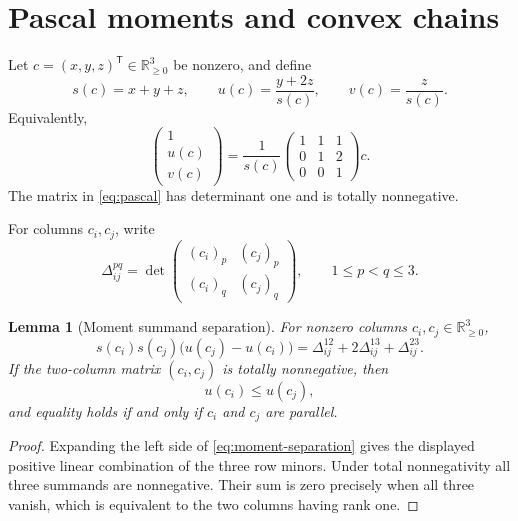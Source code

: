 \documentclass{amsart}
\numberwithin{equation}{section}
\newtheorem{lemma}[theorem]{Lemma}
\theoremstyle{definition}
\theoremstyle{remark}
\newcommand{\RR}{\mathbb R}
\newcommand{\transpose}{\mathsf T}
\begin{document}
\section{Pascal moments and convex chains}

Let $c=(x,y,z)^{\transpose}\in\RR_{\ge0}^3$ be nonzero, and define
\begin{equation}\label{eq:moments}
 s(c)=x+y+z,
 \qquad
 u(c)=\frac{y+2z}{s(c)},
 \qquad
 v(c)=\frac{z}{s(c)}.
\end{equation}
Equivalently,
\begin{equation}\label{eq:pascal}
 \begin{pmatrix}1\\u(c)\\v(c)\end{pmatrix}
 =\frac1{s(c)}
 \begin{pmatrix}
 1&1&1\\
 0&1&2\\
 0&0&1
 \end{pmatrix}c.
\end{equation}
The matrix in \eqref{eq:pascal} has determinant one and is totally nonnegative.

For columns $c_i,c_j$, write
\[
 \Delta^{pq}_{ij}
 =\det\begin{pmatrix}(c_i)_p&(c_j)_p\\(c_i)_q&(c_j)_q\end{pmatrix},
 \qquad 1\le p<q\le3.
\]

\begin{lemma}[Moment summand separation]\label{lem:moment-separation}
For nonzero columns $c_i,c_j\in\RR_{\ge0}^3$,
\begin{equation}\label{eq:moment-separation}
 s(c_i)s(c_j)\bigl(u(c_j)-u(c_i)\bigr)
 =\Delta^{12}_{ij}+2\Delta^{13}_{ij}+\Delta^{23}_{ij}.
\end{equation}
If the two-column matrix $(c_i,c_j)$ is totally nonnegative, then
\[
 u(c_i)\le u(c_j),
\]
and equality holds if and only if $c_i$ and $c_j$ are parallel.
\end{lemma}

\begin{proof}
Expanding the left side of \eqref{eq:moment-separation} gives the displayed positive linear combination of the three row minors.  Under total nonnegativity all three summands are nonnegative.  Their sum is zero precisely when all three vanish, which is equivalent to the two columns having rank one.
\end{proof}
\end{document}
